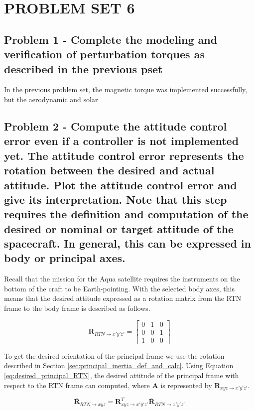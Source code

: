 \section{\Large PROBLEM SET 6}

\subsection{Problem 1 - Complete the modeling and verification of perturbation torques as described in the previous pset}

In the previous problem set, the magnetic torque was implemented successfully, but the aerodynamic and solar 

\subsection{Problem 2 - Compute the attitude control error even if a controller is not implemented yet. The attitude control error represents the rotation between the desired and actual attitude. Plot the attitude control error and give its interpretation. Note that this step requires the definition and computation of the desired or nominal or target attitude of the spacecraft. In general, this can be expressed in body or principal axes.}

Recall that the mission for the Aqua satellite requires the instruments on the bottom of the craft to be Earth-pointing. With the selected body axes, this means that the desired attitude expressed as a rotation matrix from the RTN frame to the body frame is described as follows.

\begin{equation*}
    \boldsymbol{\bar{R}}_{RTN \rightarrow x'y'z'} = \begin{bmatrix}
        0 & 1 & 0 \\ 0 & 0 & 1 \\ 1 & 0 & 0
    \end{bmatrix}
\end{equation*}

To get the desired orientation of the principal frame we use the rotation described in Section \ref{sec:principal_inertia_def_and_calc}. Using Equation \ref{eq:desired_principal_RTN}, the desired attitude of the principal frame with respect to the RTN frame can computed, where $\boldsymbol{A}$ is represented by $\boldsymbol{R}_{xyz \rightarrow x'y'z'}$.

\begin{equation} \label{eq:desired_principal_RTN}
    \boldsymbol{\bar{R}}_{RTN \rightarrow xyz} = \boldsymbol{R}_{xyz \rightarrow x'y'z'}^T \boldsymbol{\bar{R}}_{RTN \rightarrow x'y'z'}
\end{equation}

